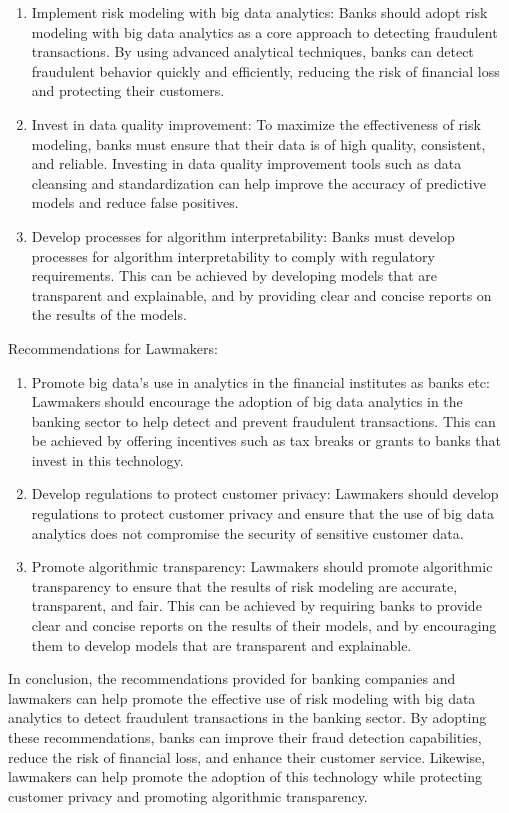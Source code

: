 \begin{enumerate}
\item Implement risk modeling with big data analytics: Banks should adopt risk modeling with big data analytics as 
a core approach to detecting fraudulent transactions. By using advanced analytical techniques, banks can detect 
fraudulent behavior quickly and efficiently, reducing the risk of financial loss and protecting their customers.
\item Invest in data quality improvement: To maximize the effectiveness of risk modeling, banks must ensure that 
their data is of high quality, consistent, and reliable. Investing in data quality improvement tools such as data 
cleansing and standardization can help improve the accuracy of predictive models and reduce false positives.
\item Develop processes for algorithm interpretability: Banks must develop processes for algorithm interpretability 
to comply with regulatory requirements. This can be achieved by developing models that are transparent and 
explainable, and by providing clear and concise reports on the results of the models.
\end{enumerate}

Recommendations for Lawmakers:

\begin{enumerate}
    \item Promote big data's use in analytics in the financial institutes as banks etc: Lawmakers should encourage 
    the adoption of big data analytics in the banking sector to help detect and prevent fraudulent transactions. 
    This can be achieved by offering incentives such as tax breaks or grants to banks that invest in this 
    technology.
    \item Develop regulations to protect customer privacy: Lawmakers should develop regulations to protect customer 
    privacy and ensure that the use of big data analytics does not compromise the security of sensitive customer 
    data.
    \item Promote algorithmic transparency: Lawmakers should promote algorithmic transparency to ensure that the 
    results of risk modeling are accurate, transparent, and fair. This can be achieved by requiring banks to provide 
    clear and concise reports on the results of their models, and by encouraging them to develop models that are 
    transparent and explainable.\\
\end{enumerate}
In conclusion, the recommendations provided for banking companies and lawmakers can help promote the effective use 
of risk modeling with big data analytics to detect fraudulent transactions in the banking sector. By adopting these 
recommendations, banks can improve their fraud detection capabilities, reduce the risk of financial loss, and 
enhance their customer service. Likewise, lawmakers can help promote the adoption of this technology while 
protecting customer privacy and promoting algorithmic transparency.
